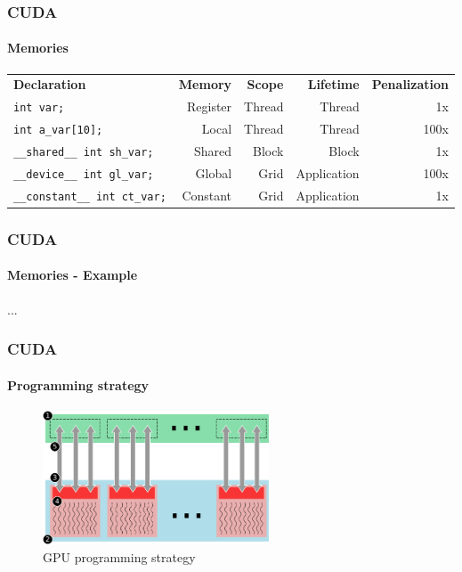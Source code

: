 \begin{frame}[fragile]
    \frametitle{CUDA}
    \framesubtitle{Memories}
    \begin{table}
    \centering
    \label{tab:memories-penalty}
    \scriptsize
    \begin{tabular}{l|r|r|r|r}
        \textbf{Declaration}  & \textbf{Memory}   & \textbf{Scope}  & \textbf{Lifetime}    & \textbf{Penalization} \\
        \texttt{int var;}                      & Register & Thread & Thread      & 1x \\
        \texttt{int a\_var[10];}            & Local    & Thread & Thread      & 100x \\
        \texttt{\_\_shared\_\_ int sh\_var;}    & Shared   & Block  & Block       & 1x \\
        \texttt{\_\_device\_\_ int gl\_var;}    & Global   & Grid   & Application & 100x \\
        \texttt{\_\_constant\_\_ int ct\_var;}& Constant & Grid   & Application & 1x 
    \end{tabular}
    \label{CUDA Memories}
    \end{table}
\end{frame}

\begin{frame}
    \frametitle{CUDA}
    \framesubtitle{Memories - Example}

    ...
\end{frame}

\begin{frame}
    \frametitle{CUDA}
    \framesubtitle{Programming strategy}
    \begin{figure}
        \centering
        \label{fig:cuda-strategy}
        \includegraphics[width=0.6\textwidth]{img/cuda-strategy}
        \caption{GPU programming strategy}
    \end{figure}
\end{frame}
